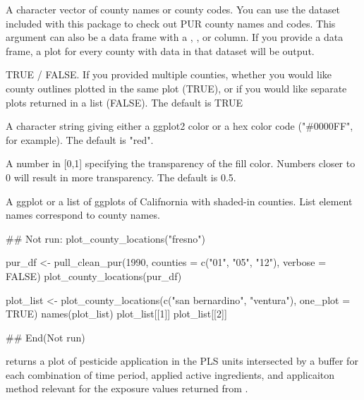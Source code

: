 \documentclass[a4paper]{book}
\begin{document}
%
\begin{Arguments}
\begin{ldescription}
\item[\code{counties\_or\_df}] A character vector of county names or county codes.
You can use the  dataset included with this package to
check out PUR county names and codes. This argument can also be a data frame
with a , , or  column. If
you provide a data frame, a plot for every county with data in that dataset
will be output.

\item[\code{one\_plot}] TRUE / FALSE. If you provided multiple counties, whether you
would like county outlines plotted in the same plot (TRUE), or if you would
like separate plots returned in a list (FALSE). The default is TRUE

\item[\code{fill\_color}] A character string giving either a ggplot2 color or a
hex color code ("\#0000FF", for example). The default is "red".

\item[\code{alpha}] A number in [0,1] specifying the transparency of the fill
color. Numbers closer to 0 will result in more transparency. The default is
0.5.
\end{ldescription}
\end{Arguments}
%
\begin{Value}
A ggplot or a list of ggplots of Califnornia with shaded-in counties.
List element names correspond to county names.
\end{Value}
%
\begin{Examples}
\begin{ExampleCode}
## Not run:
plot_county_locations("fresno")

pur_df <- pull_clean_pur(1990, counties = c("01", "05", "12"), verbose = FALSE)
plot_county_locations(pur_df)

plot_list <- plot_county_locations(c("san bernardino", "ventura"), one_plot = TRUE)
names(plot_list)
plot_list[[1]]
plot_list[[2]]

## End(Not run)

\end{ExampleCode}
\end{Examples}
%
\begin{Description}\relax
{} returns a plot of pesticide application in the PLS units
intersected by a buffer for each combination of time period, applied active
ingredients, and applicaiton method relevant for the exposure values returned
from .
\end{Description}
\end{document}
